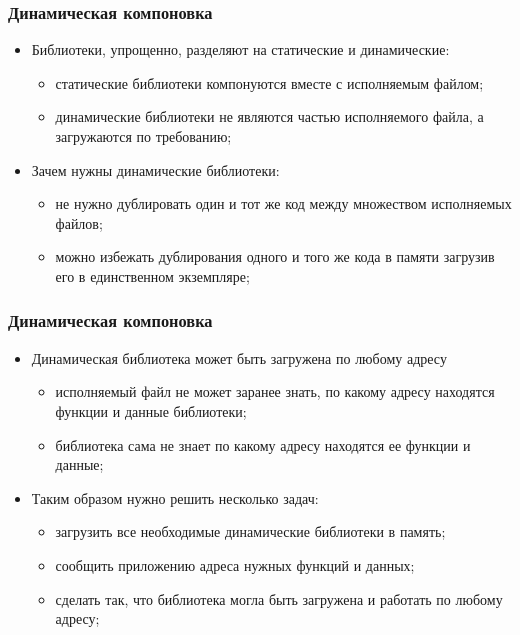 \begin{frame}
\frametitle{Динамическая компоновка}
\begin{itemize}
  \item<1-> Библиотеки, упрощенно, разделяют на статические и динамические:
    \begin{itemize}
      \item статические библиотеки компонуются вместе с исполняемым файлом;
      \item динамические библиотеки не являются частью исполняемого файла, а загружаются по требованию;
    \end{itemize}
  \item<2-> Зачем нужны динамические библиотеки:
    \begin{itemize}
      \item не нужно дублировать один и тот же код между множеством исполняемых файлов;
      \item можно избежать дублирования одного и того же кода в памяти загрузив его в единственном экземпляре;
    \end{itemize}
\end{itemize}
\end{frame}

\begin{frame}
\frametitle{Динамическая компоновка}
\begin{itemize}
  \item<1-> Динамическая библиотека может быть загружена по любому адресу
    \begin{itemize}
      \item исполняемый файл не может заранее знать, по какому адресу находятся функции и данные библиотеки;
      \item библиотека сама не знает по какому адресу находятся ее функции и данные;
    \end{itemize}
  \item<2-> Таким образом нужно решить несколько задач:
    \begin{itemize}
      \item загрузить все необходимые динамические библиотеки в память;
      \item сообщить приложению адреса нужных функций и данных;
      \item сделать так, что библиотека могла быть загружена и работать по любому адресу;
    \end{itemize}
\end{itemize}
\end{frame}

